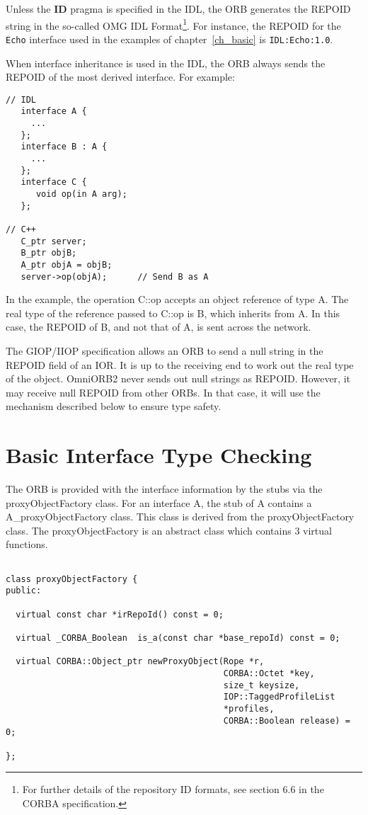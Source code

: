 \documentclass[11pt,twoside,onecolumn]{book}
\begin{document}
Unless the {\bf ID} pragma is specified in the IDL, the ORB generates the
REPOID string in the so-called OMG IDL Format\footnote{For further details
of the repository ID formats, see section 6.6 in the CORBA
specification.}. For instance, the REPOID for the {\tt Echo} interface used
in the examples of chapter~\ref{ch_basic} is {\tt IDL:Echo:1.0}.

When interface inheritance is used in the IDL, the ORB always sends the
REPOID of the most derived interface. For example:

{\small
\begin{verbatim}
// IDL
   interface A {
     ...
   };
   interface B : A {
     ...
   };
   interface C {
      void op(in A arg);
   };

// C++
   C_ptr server;
   B_ptr objB;
   A_ptr objA = objB;
   server->op(objA);      // Send B as A
\end{verbatim}
}

In the example, the operation C::op accepts an object reference of type
A. The real type of the reference passed to C::op is B, which inherits from
A. In this case, the REPOID of B, and not that of A, is sent across the
network.

The GIOP/IIOP specification allows an ORB to send a null string in the
REPOID field of an IOR. It is up to the receiving end to work out the real
type of the object. OmniORB2 never sends out null strings as
REPOID. However, it may receive null REPOID from other ORBs. In that case,
it will use the mechanism described below to ensure type safety.

\section{Basic Interface Type Checking}
\label{sec_intf}

The ORB is provided with the interface information by the stubs via the
proxyObjectFactory class. For an interface A, the stub of A contains a
A\_proxyObjectFactory class. This class is derived from the
proxyObjectFactory class. The proxyObjectFactory is an abstract class which
contains 3 virtual functions.

{\small
\begin{verbatim}

class proxyObjectFactory {
public:

  virtual const char *irRepoId() const = 0;

  virtual _CORBA_Boolean  is_a(const char *base_repoId) const = 0;
       
  virtual CORBA::Object_ptr newProxyObject(Rope *r,
                                           CORBA::Octet *key,
                                           size_t keysize,
                                           IOP::TaggedProfileList
                                           *profiles,
                                           CORBA::Boolean release) = 0;

};

\end{verbatim}
}
\end{document}
